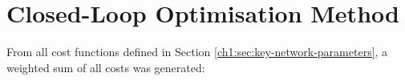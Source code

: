 \section{Closed-Loop Optimisation Method}
\label{ch1:sec:closed-loop-optimisation-method}

From all cost functions defined in Section \ref{ch1:sec:key-network-parameters}, a weighted sum of all costs was generated:

